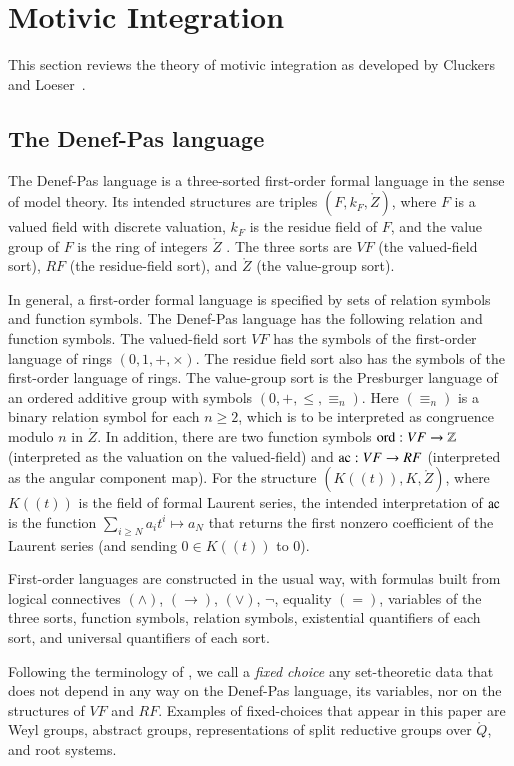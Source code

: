 \section{Motivic Integration}

This section reviews the theory of motivic integration as developed by
Cluckers and Loeser~\cite{cluckers2008constructible}.

\subsection{The Denef-Pas language}

The Denef-Pas language is a three-sorted first-order formal language
in the sense of model theory.  Its intended structures are triples
$(F,k_F,\ring{Z})$, where $F$ is a valued field with discrete
valuation, $k_F$ is the residue field of $F$, and the value group of
$F$ is the ring of integers $\ring{Z}$ .  The three sorts are $VF$
(the valued-field sort), $RF$ (the residue-field sort), and $\ring{Z}$
(the value-group sort).

In general, a first-order formal language is specified by sets of
relation symbols and function symbols.  The Denef-Pas language has the
following relation and function symbols.  The valued-field sort $VF$
has the symbols of the first-order language of rings $(0,1,+,\times)$.
The residue field sort also has the symbols of the first-order
language of rings.  The value-group sort is the Presburger language of
an ordered additive group with symbols $(0,+,\le,\equiv_n)$.  Here
$(\equiv_n)$ is a binary relation symbol for each $n\ge 2$, which is
to be interpreted as congruence modulo $n$ in $\ring{Z}$.  In
addition, there are two function symbols ${\operatorname{ord}}:VF\to\mathbb{Z}$
(interpreted as the valuation on the valued-field) and ${\operatorname{ac}}:VF\to
RF$ (interpreted as the angular component map).  For the structure
$(K((t)),K,\ring{Z})$, where $K((t))$ is the field of formal Laurent
series, the intended interpretation of ${\operatorname{ac}}$ is the function
$\sum_{i\ge N} a_i t^i\mapsto a_N$ that returns the first nonzero
coefficient of the Laurent series (and sending $0\in K((t))$ to $0$).

First-order languages are constructed in the usual way, with formulas
built from logical connectives $(\land)$, $(\to)$, $(\lor)$, $\neg$,
equality $(=)$, variables of the three sorts, function symbols,
relation symbols, existential quantifiers of each sort, and universal
quantifiers of each sort.

Following the terminology of \cite{gordon}, we call a {\it fixed
  choice} any set-theoretic data that does not depend in any way on
the Denef-Pas language, its variables, nor on the structures of $VF$
and $RF$.  Examples of fixed-choices that appear in this paper are
Weyl groups, abstract groups, representations of split reductive
groups over $\ring{Q}$, and root systems.

